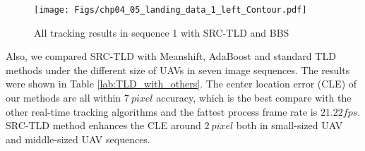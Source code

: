 \begin{figure}[!th]
	\centering
	\texttt{[image: Figs/chp04\_05\_landing\_data\_1\_left\_Contour.pdf]}
	\caption{All tracking results in sequence 1 with SRC-TLD and BBS}
	\label{fig:chp04_05_landing_data_1_left_Contour}    
\end{figure}

Also, we compared SRC-TLD with Meanshift, AdaBoost and standard TLD methods under the different size of UAVs in seven image sequences. The results were shown in Table \ref{lab:TLD_with_others}. The center location error (CLE) of our methods are all within $7\ pixel$ accuracy, which is the best compare with the other real-time tracking algorithms and the fattest process frame rate is $21.22 fps$. SRC-TLD method enhances the CLE around $2\ pixel$ both in small-sized UAV and middle-sized UAV sequences.

